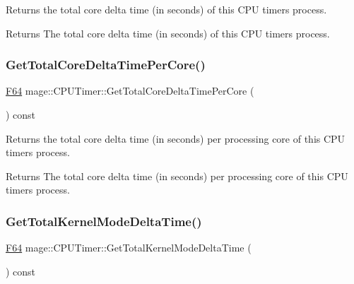 Returns the total core delta time (in seconds) of this C\+PU timer\textquotesingle{}s process.

\begin{DoxyReturn}{Returns}
The total core delta time (in seconds) of this C\+PU timer\textquotesingle{}s process. 
\end{DoxyReturn}
\hypertarget{classmage_1_1_c_p_u_timer_af098c9df9e25e29beee131bb1de8c482}{}\label{classmage_1_1_c_p_u_timer_af098c9df9e25e29beee131bb1de8c482} 
\subsubsection{\texorpdfstring{Get\+Total\+Core\+Delta\+Time\+Per\+Core()}{GetTotalCoreDeltaTimePerCore()}}
{\footnotesize\ttfamily \hyperlink{namespacemage_ad26233bbec640deda836e572c1a23708}{F64} mage\+::\+C\+P\+U\+Timer\+::\+Get\+Total\+Core\+Delta\+Time\+Per\+Core (\begin{DoxyParamCaption}{ }\end{DoxyParamCaption}) const\hspace{0.3cm}{\ttfamily [noexcept]}}

Returns the total core delta time (in seconds) per processing core of this C\+PU timer\textquotesingle{}s process.

\begin{DoxyReturn}{Returns}
The total core delta time (in seconds) per processing core of this C\+PU timer\textquotesingle{}s process. 
\end{DoxyReturn}
\hypertarget{classmage_1_1_c_p_u_timer_a38cb7adfd830f9d8c7a567f30ebcdf24}{}\label{classmage_1_1_c_p_u_timer_a38cb7adfd830f9d8c7a567f30ebcdf24} 
\subsubsection{\texorpdfstring{Get\+Total\+Kernel\+Mode\+Delta\+Time()}{GetTotalKernelModeDeltaTime()}}
{\footnotesize\ttfamily \hyperlink{namespacemage_ad26233bbec640deda836e572c1a23708}{F64} mage\+::\+C\+P\+U\+Timer\+::\+Get\+Total\+Kernel\+Mode\+Delta\+Time (\begin{DoxyParamCaption}{ }\end{DoxyParamCaption}) const\hspace{0.3cm}{\ttfamily [noexcept]}}

